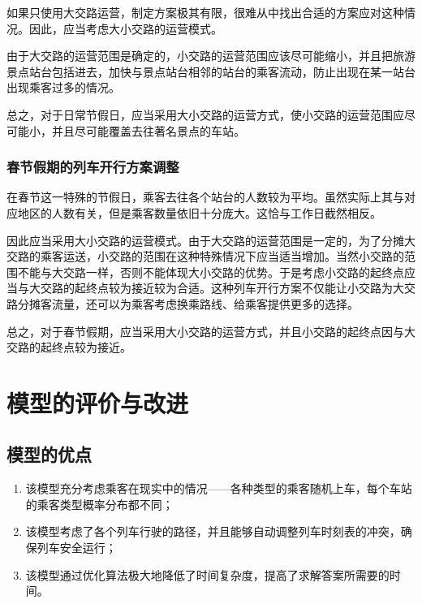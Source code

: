 如果只使用大交路运营，制定方案极其有限，很难从中找出合适的方案应对这种情况。因此，应当考虑大小交路的运营模式。

由于大交路的运营范围是确定的，小交路的运营范围应该尽可能缩小，并且把旅游景点站台包括进去，加快与景点站台相邻的站台的乘客流动，防止出现在某一站台出现乘客过多的情况。

总之，对于日常节假日，应当采用大小交路的运营方式，使小交路的运营范围应尽可能小，并且尽可能覆盖去往著名景点的车站。

\subsubsection{春节假期的列车开行方案调整}

在春节这一特殊的节假日，乘客去往各个站台的人数较为平均。虽然实际上其与对应地区的人数有关，但是乘客数量依旧十分庞大。这恰与工作日截然相反。

因此应当采用大小交路的运营模式。由于大交路的运营范围是一定的，为了分摊大交路的乘客运送，小交路的范围在这种特殊情况下应当适当增加。当然小交路的范围不能与大交路一样，否则不能体现大小交路的优势。于是考虑小交路的起终点应当与大交路的起终点较为接近较为合适。这种列车开行方案不仅能让小交路为大交路分摊客流量，还可以为乘客考虑换乘路线、给乘客提供更多的选择。

总之，对于春节假期，应当采用大小交路的运营方式，并且小交路的起终点因与大交路的起终点较为接近。


%
%

\section{模型的评价与改进}

\subsection{模型的优点}

\begin{enumerate}
    \item 该模型充分考虑乘客在现实中的情况——各种类型的乘客随机上车，每个车站的乘客类型概率分布都不同；
    \item 该模型考虑了各个列车行驶的路径，并且能够自动调整列车时刻表的冲突，确保列车安全运行；
    \item 该模型通过优化算法极大地降低了时间复杂度，提高了求解答案所需要的时间。
\end{enumerate}

